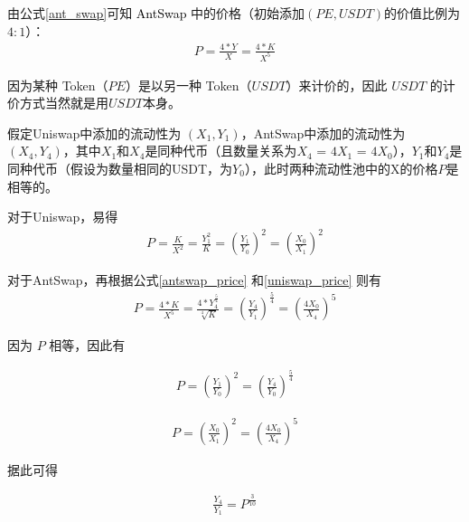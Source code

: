 \documentclass{article}
\begin{document}
由公式\ref{ant_swap}可知 \textcolor{black}{AntSwap} 中的价格（初始添加$(PE, USDT)$的价值比例为$4:1$）：
\begin{equation} \label{antswap_price}
\begin{split}
P = \frac{4 * Y}{X} = \frac{4 * K}{X^5}
\end{split}
\end{equation}

因为某种 Token（$PE$）是以另一种 Token（$USDT$）来计价的，因此 $USDT$ 的计价方式当然就是用$USDT$本身。


假定Uniswap中添加的流动性为 $(X_1, Y_1)$，AntSwap中添加的流动性为 $(X_4, Y_4)$，其中$X_1$和$X_4$是同种代币（且数量关系为$X_4$ = $4X_1$ = $4X_0$），$Y_1$和$Y_4$是同种代币（假设为数量相同的USDT，为$Y_0$），此时两种流动性池中的X的价格$P$是相等的。

对于Uniswap，易得
\begin{equation*}
\begin{split}
P = \frac{K}{X^2} = \frac{Y_1^2}{K} = (\frac{Y_1}{Y_0})^2 = (\frac{X_0}{X_1})^2
\end{split}
\end{equation*}

对于AntSwap，再根据公式\ref{antswap_price} 和\ref{uniswap_price} 则有
\begin{equation*}
\begin{split}
P = \frac{4 * K}{X^5} = \frac{4 * Y_4^\frac{5}{4}}{\sqrt[4]{K}} = (\frac{Y_4}{Y_1})^\frac{5}{4} = (\frac{4X_0}{X_4})^5
\end{split}
\end{equation*}

因为 $P$ 相等，因此有

\begin{equation*}
\begin{split}
P = (\frac{Y_1}{Y_0})^2 = (\frac{Y_4}{Y_0})^\frac{5}{4}
\end{split}
\end{equation*}

\begin{equation*}
\begin{split}
P = (\frac{X_0}{X_1})^2 = (\frac{4X_0}{X_4})^5
\end{split}
\end{equation*}

据此可得

\begin{equation} \label{uniswap_antswap_price_relative_y}
\begin{split}
\frac{Y_4}{Y_1} = P^\frac{3}{10}
\end{split}
\end{equation}
\end{document}
